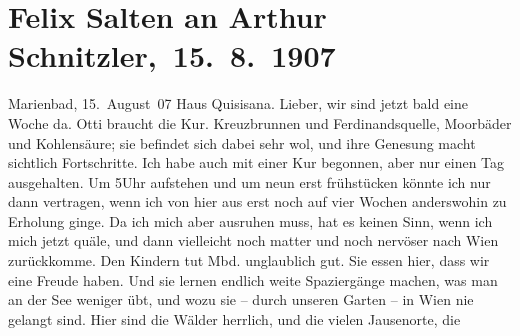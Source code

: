                \section[ Felix Salten an Arthur Schnitzler, 15. 8. 1907]{ Felix Salten an Arthur Schnitzler, 15. 8. 1907}\nopagebreak{}\rehead{ }\begin{ledgroupsized}[t]{13cm}\normalsize\beginnumbering \toendnotes[C]{\smallbreak\pagebreak[2]} 
\toendnotes[C]{\smallbreak}\pstart
           \raggedleft{}{\pb}Marienbad, 15. August 07\pend
           \pstart
           \raggedleft{}Haus Quisisana.\pend
           \pstart
           Lieber, wir sind jetzt bald eine Woche da. Otti braucht die Kur. Kreuzbrunnen und Ferdinandsquelle,
               Moorbäder und Kohlensäure; sie befindet sich dabei sehr wol, und ihre Genesung macht
               sichtlich Fortschritte. Ich habe auch mit einer Kur begonnen, aber nur einen Tag
               ausgehalten. Um 5Uhr aufstehen und um neun erst frühstücken
               könnte ich nur dann vertragen, wenn ich von hier aus erst noch auf vier Wochen
               anderswohin zu Erholung ginge. Da ich mich aber ausruhen muss, hat es keinen Sinn,
               wenn ich mich jetzt quäle, und dann vielleicht noch matter und noch nervöser nach Wien zurückkomme. Den Kindern tut Mbd. unglaublich gut. Sie essen hier, dass wir eine Freude
               haben. Und sie lernen endlich weite Spaziergänge machen, was man an der See weniger
               übt, und wozu sie – durch unseren Garten – in Wien
               nie gelangt sind. Hier sind die Wälder herrlich, und die vielen Jausenorte, die

\end{ledgroupsized}
